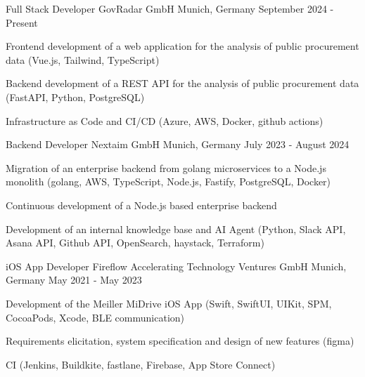 


\begin{cventries}


\cventry
{Full Stack Developer} %
{GovRadar GmbH} %
{Munich, Germany} %
{September 2024 - Present} %
{ %
\begin{cvitems}
\item {Frontend development of a web application for the analysis of public procurement data (Vue.js, Tailwind, TypeScript)}
\item {Backend development of a REST API for the analysis of public procurement data (FastAPI, Python, PostgreSQL)}
\item {Infrastructure as Code and CI/CD (Azure, AWS, Docker, github actions)}
\end{cvitems}
}


\cventry
{Backend Developer} %
{Nextaim GmbH} %
{Munich, Germany} %
{July 2023 - August 2024} %
{ %
\begin{cvitems}
\item {Migration of an enterprise backend from golang microservices to a Node.js monolith (golang, AWS, TypeScript, Node.js, Fastify, PostgreSQL, Docker)}
\item {Continuous development of a Node.js based enterprise backend}
\item {Development of an internal knowledge base and AI Agent (Python, Slack API, Asana API, Github API, OpenSearch, haystack, Terraform)}
\end{cvitems}
}


\cventry
{iOS App Developer} %
{Fireflow Accelerating Technology Ventures GmbH} %
{Munich, Germany} %
{May 2021 - May 2023} %
{ %
\begin{cvitems}
\item {Development of the Meiller MiDrive iOS App (Swift, SwiftUI, UIKit, SPM, CocoaPods, Xcode, BLE communication)}
\item {Requirements elicitation, system specification and design of new features (figma)}
\item {CI (Jenkins, Buildkite, fastlane, Firebase, App Store Connect)}
\end{cvitems}
}


\end{cventries}

